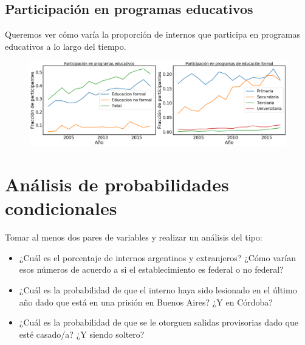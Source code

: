 \documentclass[10pt]{article}
\begin{document}
\subsection{Participación en programas educativos}

Queremos ver cómo varía la proporción de internos que participa en programas educativos a lo largo del tiempo.

\begin{figure}[H]
	\centering
	\includegraphics[scale=0.28]{graficos/educacion.png}
	\caption{}
\end{figure}

\section{Análisis de probabilidades condicionales}
Tomar al menos dos pares de variables y realizar un análisis del tipo:

\begin{itemize}
	\item ¿Cuál es el porcentaje de internos argentinos y extranjeros? ¿Cómo varían esos números de acuerdo a si el establecimiento es federal o no federal?
	\item ¿Cuál es la probabilidad de que el interno haya sido lesionado en el último año dado que está en una prisión en Buenos Aires? ¿Y en Córdoba?
	\item ¿Cuál es la probabilidad de que se le otorguen salidas provisorias dado que esté casado/a? ¿Y siendo soltero?
\end{itemize}
\end{document}
